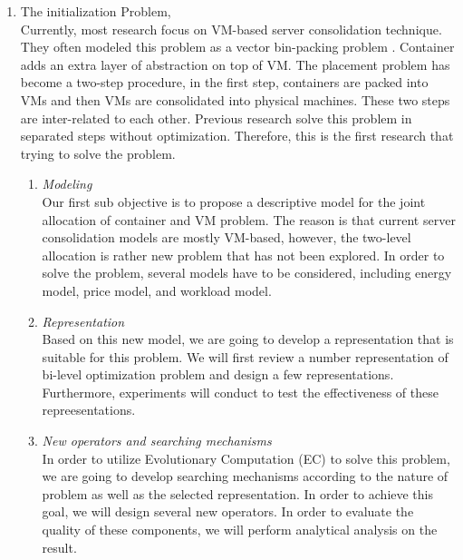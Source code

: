 \begin{enumerate}
	\item The initialization Problem, \\ 
	Currently, most research focus on VM-based server consolidation technique. They often modeled this problem as a vector bin-packing problem \cite{Zhang:2016cx}. Container adds an extra layer of abstraction on top of VM. The placement problem has become a two-step procedure, in the first step, containers are packed into VMs and then VMs are consolidated into physical machines. These two steps are inter-related to each other. Previous research \cite{Piraghaj:2015uf} solve this problem in separated steps without optimization. Therefore, this is the first research that trying to solve the problem.
	\begin{enumerate}
		\item \emph{Modeling} \\
		Our first sub objective is to propose a descriptive model for the joint allocation of container and VM problem. The reason is that current server consolidation models are mostly VM-based, however, the two-level allocation is rather new problem that has not been explored. In order to solve the problem, several models have to be considered, including energy model, price model, and workload model.
		\item \emph{Representation} \\
		Based on this new model, we are going to develop a representation that is suitable for this problem. We will first review a number representation of bi-level optimization problem and design a few representations. Furthermore, experiments will conduct to test the effectiveness of these repreesentations.
		\item \emph{New operators and searching mechanisms}\\
		In order to utilize Evolutionary Computation (EC) to solve this problem, we are going to develop searching mechanisms according to the nature of problem as well as the selected representation. In order to achieve this goal, we will design several new operators. In order to evaluate the quality of these components, we will perform analytical analysis on the result.
	\end{enumerate}


\end{enumerate}
